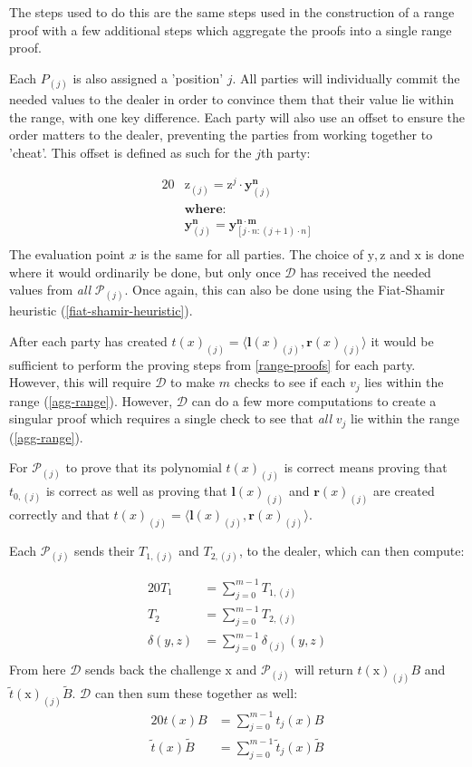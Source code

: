 \documentclass{article}
\newcommand{\eq}[1]{\begin{alignat*}{20}#1\end{alignat*}}
\renewcommand{\vec}[1]{\boldsymbol{#1}}
\newcommand{\ran}[1]{\mathrm{#1}}
\newcommand{\vecran}[1]{\mathbf{#1}}
\renewcommand{\P}{\mathcal{P}}
\newcommand{\D}{\mathcal{D}}
\newcommand{\dotp}[2]{\langle #1, #2 \rangle}
\newcommand{\blind}[1]{\widetilde{#1}}
\newcommand{\bt}{\blind{t}}
\newcommand{\bB}{\blind{B}}
\begin{document}
The steps used to do this are the same steps used in the construction
of a range proof with a few additional steps which aggregate the proofs
into a single range proof.

Each $P_{(j)}$ is also assigned a 'position' $j$. All parties will
individually commit the needed values to the dealer in order to
convince them that their value lie within the range, with one key
difference. Each party will also use an offset to ensure the order 
matters to the dealer, preventing the parties from working together 
to 'cheat'. This offset is defined as such for the $j$th party:

\eq{
	&\ran{z}_{(j)}   = \ran{z}^j \cdot \vecran{y}^{\vec{n}}_{(j)} \\
	&\textbf{where:}\\
	&\vecran{y}^{\vec{n}}_{(j)} = \vecran{y}^{\vec{n \cdot m}}_{[j \cdot n:(j+1) \cdot n]} \\
}
The evaluation point $x$ is the same for all parties. The choice
of $\ran{y}, \ran{z}$ and $\ran{x}$ is done where it would ordinarily
be done, but only once $\D$ has received the needed values from \textit{all}
$\P_{(j)}$. Once again, this can also be done using the Fiat-Shamir
heuristic (\ref{fiat-shamir-heuristic}).

After each party has created $t(x)_{(j)} =
\dotp{\vec{l}(x)_{(j)}}{\vec{r}(x)_{(j)}}$ it would be sufficient
to perform the proving steps from \ref{range-proofs} for each
party. However, this will require $\D$ to make $m$ checks to see if
each $v_j$ lies within the range (\ref{agg-range}). However, $\D$ can
do a few more computations to create a singular proof which requires
a single check to see that \textit{all} $v_j$ lie within the range
(\ref{agg-range}).

For $\P_{(j)}$ to prove that its polynomial $t(x)_{(j)}$ is correct
means proving that $t_{0,(j)}$ is correct as well as proving that
$\vec{l}(x)_{(j)}$ and $\vec{r}(x)_{(j)}$ are created correctly and
that $t(x)_{(j)} = \dotp{\vec{l}(x)_{(j)}}{\vec{r}(x)_{(j)}}$.

Each $\P_{(j)}$ sends their $T_{1,(j)}$ and $T_{2,(j)}$, to the dealer,
which can then compute:

\eq{
	T_1 &= \sum^{m-1}_{j = 0} T_{1,(j)}\\
	T_2 &= \sum^{m-1}_{j = 0} T_{2,(j)}\\
	\delta(y,z) &= \sum^{m-1}_{j = 0} \delta_{(j)}(y,z) \\
}
From here $\D$ sends back the challenge $\ran{x}$ and $\P_{(j)}$
will return $t(\ran{x})_{(j)}B$ and $\bt(\ran{x})_{(j)}\bB$. $\D$
can then sum these together as well:
\eq{
t(x)B &= \sum^{m-1}_{j = 0} t_{j}(x)B\\
\bt(x)\bB &= \sum^{m-1}_{j = 0} \bt_{j}(x)\bB
}
\end{document}
